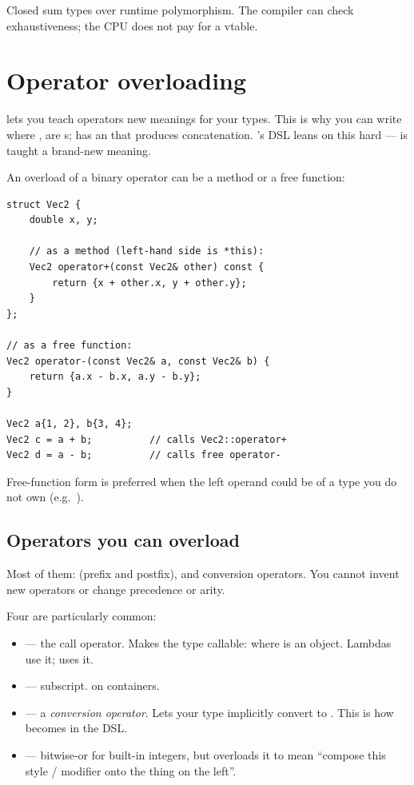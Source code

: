 \begin{idea}
Closed sum types over runtime polymorphism. The compiler can check
exhaustiveness; the CPU does not pay for a vtable.
\end{idea}

\section{Operator overloading}
\label{sec:cpp:operators}

\cpp{} lets you teach operators new meanings for your types. This is
why you can write  where ,  are
s;  has an  that
produces concatenation. \maya{}'s DSL leans on this hard ---
\code{|} is taught a brand-new meaning.

An overload of a binary operator can be a method or a free function:

\begin{lstlisting}
struct Vec2 {
    double x, y;

    // as a method (left-hand side is *this):
    Vec2 operator+(const Vec2& other) const {
        return {x + other.x, y + other.y};
    }
};

// as a free function:
Vec2 operator-(const Vec2& a, const Vec2& b) {
    return {a.x - b.x, a.y - b.y};
}

Vec2 a{1, 2}, b{3, 4};
Vec2 c = a + b;          // calls Vec2::operator+
Vec2 d = a - b;          // calls free operator-
\end{lstlisting}

Free-function form is preferred when the left operand could be of a
type you do not own (e.g.\ ).

\subsection{Operators you can overload}

Most of them:  (prefix and postfix), and
conversion operators. You cannot invent new operators or change
precedence or arity.

Four are particularly common:

\begin{itemize}[leftmargin=*]
  \item {} --- the call operator. Makes the type
    callable:  where  is an object. Lambdas
    use it;  uses it.
  \item {} --- subscript.  on containers.
  \item {} --- a \emph{conversion operator}. Lets
    your type implicitly convert to . This is how
     becomes  in the DSL.
  \item {} --- bitwise-or for built-in integers, but
    \maya{} overloads it to mean ``compose this style / modifier
    onto the thing on the left''.
\end{itemize}


